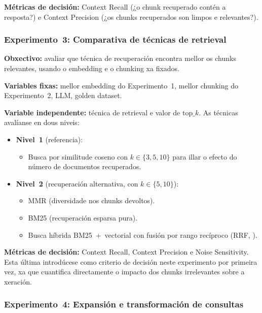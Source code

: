 \documentclass[11pt, a4paper, oneside]{report}
\begin{document}
\textbf{Métricas de decisión:} Context Recall (¿o chunk recuperado contén a resposta?)
e Context Precision (¿os chunks recuperados son limpos e relevantes?).

\subsubsection{Experimento~3: Comparativa de técnicas de retrieval}
\label{sec:exp3_retrieval}

\textbf{Obxectivo:} avaliar que técnica de recuperación encontra mellor os chunks
relevantes, usando o embedding e o chunking xa fixados.

\textbf{Variables fixas:} mellor embedding do Experimento~1, mellor chunking do
Experimento~2, LLM, golden dataset.

\textbf{Variable independente:} técnica de retrieval e valor de $\text{top}\_k$.
As técnicas avalíanse en dous niveis:

\begin{itemize}
  \item \textbf{Nivel~1} (referencia):
    \begin{itemize}
      \item Busca por similitude coseno con $k \in \{3, 5, 10\}$ para illar o efecto
        do número de documentos recuperados.
    \end{itemize}
  \item \textbf{Nivel~2} (recuperación alternativa, con $k \in \{5, 10\}$):
    \begin{itemize}
      \item \ac{MMR} (diversidade nos chunks devoltos).
      \item BM25 \citep{robertson2009probabilistic} (recuperación esparsa pura).
      \item Busca híbrida BM25~+~vectorial con fusión por rango recíproco
        (\ac{RRF}, \citealt{cormack2009reciprocal}).
    \end{itemize}
\end{itemize}

\textbf{Métricas de decisión:} Context Recall, Context Precision e Noise Sensitivity.
Esta última introdúcese como criterio de decisión neste experimento por primeira vez,
xa que cuantifica directamente o impacto dos chunks irrelevantes sobre a xeración.

\subsubsection{Experimento~4: Expansión e transformación de consultas}
\label{sec:exp4_query_expansion}
\end{document}
